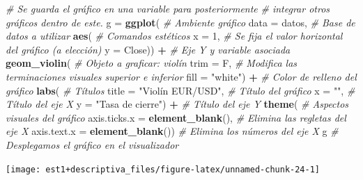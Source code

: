 \documentclass[
  11pt,
]{book}
\newenvironment{Shaded}{\begin{snugshade}}{\end{snugshade}}
\newcommand{\AttributeTok}[1]{\textcolor[rgb]{0.13,0.29,0.53}{#1}}
\newcommand{\CommentTok}[1]{\textcolor[rgb]{0.56,0.35,0.01}{\textit{#1}}}
\newcommand{\DecValTok}[1]{\textcolor[rgb]{0.00,0.00,0.81}{#1}}
\newcommand{\FunctionTok}[1]{\textcolor[rgb]{0.13,0.29,0.53}{\textbf{#1}}}
\newcommand{\NormalTok}[1]{#1}
\newcommand{\OtherTok}[1]{\textcolor[rgb]{0.56,0.35,0.01}{#1}}
\newcommand{\SpecialCharTok}[1]{\textcolor[rgb]{0.81,0.36,0.00}{\textbf{#1}}}
\newcommand{\StringTok}[1]{\textcolor[rgb]{0.31,0.60,0.02}{#1}}
\theoremstyle{definition}
\theoremstyle{definition}
\theoremstyle{definition}
\theoremstyle{definition}
\theoremstyle{remark}
\begin{document}
\begin{Shaded}
\begin{Highlighting}[]
\CommentTok{\# Se guarda el gráfico en una variable para posteriormente}
\CommentTok{\# integrar otros gráficos dentro de este.}
\NormalTok{g }\OtherTok{=} \FunctionTok{ggplot}\NormalTok{( }\CommentTok{\# Ambiente gráfico}
  \AttributeTok{data =}\NormalTok{ datos, }\CommentTok{\# Base de datos a utilizar}
  \FunctionTok{aes}\NormalTok{( }\CommentTok{\# Comandos estéticos}
    \AttributeTok{x =} \DecValTok{1}\NormalTok{, }\CommentTok{\# Se fija el valor horizontal del gráfico (a elección)}
    \AttributeTok{y =}\NormalTok{ Close)) }\SpecialCharTok{+} \CommentTok{\# Eje Y y variable asociada}
  \FunctionTok{geom\_violin}\NormalTok{( }\CommentTok{\# Objeto a graficar: violín}
    \AttributeTok{trim =}\NormalTok{ F, }\CommentTok{\# Modifica las terminaciones visuales superior e inferior}
    \AttributeTok{fill =} \StringTok{"white"}\NormalTok{) }\SpecialCharTok{+} \CommentTok{\# Color de relleno del gráfico}
  \FunctionTok{labs}\NormalTok{( }\CommentTok{\# Títulos}
    \AttributeTok{title =} \StringTok{"Violín EUR/USD"}\NormalTok{, }\CommentTok{\# Título del gráfico}
    \AttributeTok{x =} \StringTok{""}\NormalTok{, }\CommentTok{\# Título del eje X}
    \AttributeTok{y =} \StringTok{"Tasa de cierre"}\NormalTok{) }\SpecialCharTok{+} \CommentTok{\# Título del eje Y}
  \FunctionTok{theme}\NormalTok{( }\CommentTok{\# Aspectos visuales del gráfico}
    \AttributeTok{axis.ticks.x =} \FunctionTok{element\_blank}\NormalTok{(), }\CommentTok{\# Elimina las regletas del eje X}
    \AttributeTok{axis.text.x =} \FunctionTok{element\_blank}\NormalTok{()) }\CommentTok{\# Elimina los números del eje X}
\NormalTok{g }\CommentTok{\# Desplegamos el gráfico en el visualizador}
\end{Highlighting}
\end{Shaded}

\begin{center}\texttt{[image: est1+descriptiva\_files/figure-latex/unnamed-chunk-24-1]} \end{center}
\end{document}
